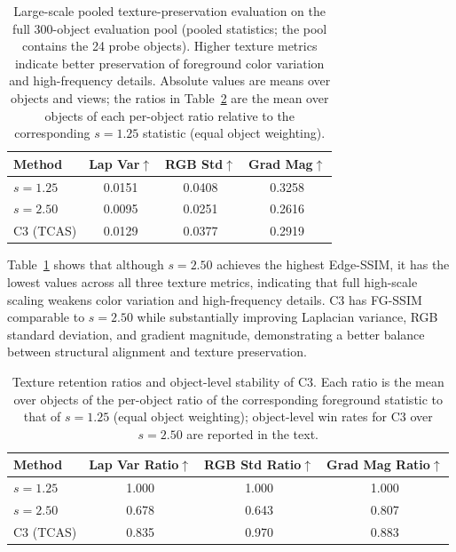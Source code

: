 \documentclass[times,twocolumn,final]{elsarticle}
\begin{document}
\begin{table}[t]
\centering
\caption{Large-scale pooled texture-preservation evaluation on the full 300-object evaluation pool (pooled statistics; the pool contains the 24 probe objects). Higher texture metrics indicate better preservation of foreground color variation and high-frequency details. Absolute values are means over objects and views; the ratios in Table~\ref{tab:retention} are the mean over objects of each per-object ratio relative to the corresponding $s = 1.25$ statistic (equal object weighting).}
\label{tab:texture300}
\small
\begin{tabular}{lccc}
\toprule
Method & Lap Var$\uparrow$ & RGB Std$\uparrow$ & Grad Mag$\uparrow$ \\
\midrule
$s = 1.25$ & 0.0151 & 0.0408 & 0.3258 \\
$s = 2.50$ & 0.0095 & 0.0251 & 0.2616 \\
C3 (TCAS) & 0.0129 & 0.0377 & 0.2919 \\
\bottomrule
\end{tabular}
\end{table}

Table~\ref{tab:texture300} shows that although $s = 2.50$ achieves the highest Edge-SSIM, it has the lowest values across all three texture metrics, indicating that full high-scale scaling weakens color variation and high-frequency details. C3 has FG-SSIM comparable to $s = 2.50$ while substantially improving Laplacian variance, RGB standard deviation, and gradient magnitude, demonstrating a better balance between structural alignment and texture preservation.


\begin{table}[t]
\centering
\caption{Texture retention ratios and object-level stability of C3. Each ratio is the mean over objects of the per-object ratio of the corresponding foreground statistic to that of $s = 1.25$ (equal object weighting); object-level win rates for C3 over $s = 2.50$ are reported in the text.}
\label{tab:retention}
\small\setlength{\tabcolsep}{4pt}
\begin{tabular}{lccc}
\toprule
Method & Lap Var Ratio$\uparrow$ & RGB Std Ratio$\uparrow$ & Grad Mag Ratio$\uparrow$ \\
\midrule
$s = 1.25$ & 1.000 & 1.000 & 1.000 \\
$s = 2.50$ & 0.678 & 0.643 & 0.807 \\
C3 (TCAS) & 0.835 & 0.970 & 0.883 \\
\bottomrule
\end{tabular}
\end{table}
\end{document}

